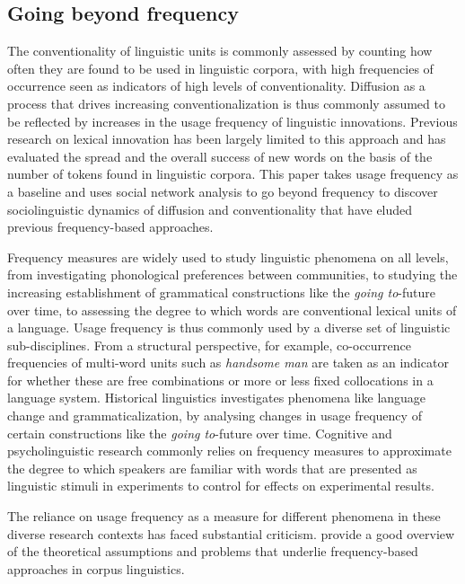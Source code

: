 \documentclass[
  a4paper,
  abstract=on,
  captions=tableabove
  ]{scrartcl}
\begin{document}
  \subsection{Going beyond frequency}
    \label{subsec:beyond-freq}

  The conventionality of linguistic units is commonly assessed by counting how often they are found to be used in linguistic corpora, with high frequencies of occurrence seen as indicators of high levels of conventionality. Diffusion as a process that drives increasing conventionalization is thus commonly assumed to be reflected by increases in the usage frequency of linguistic innovations. Previous research on lexical innovation has been largely limited to this approach and has evaluated the spread and the overall success of new words on the basis of the number of tokens found in linguistic corpora. This paper takes usage frequency as a baseline and uses social network analysis to go beyond frequency to discover sociolinguistic dynamics of diffusion and conventionality that have eluded previous frequency-based approaches.

  Frequency measures are widely used to study linguistic phenomena on all levels, from investigating phonological preferences between communities, to studying the increasing establishment of grammatical constructions like the \emph{going to}-future over time, to assessing the degree to which words are conventional lexical units of a language. Usage frequency is thus commonly used by a diverse set of linguistic sub-disciplines. From a structural perspective, for example, co-occurrence frequencies of multi-word units such as \emph{handsome man} are taken as an indicator for whether these are free combinations or more or less fixed collocations in a language system. Historical linguistics investigates phenomena like language change and grammaticalization, by analysing changes in usage frequency of certain constructions like the \emph{going to}-future over time. Cognitive and psycholinguistic research commonly relies on frequency measures to approximate the degree to which speakers are familiar with words that are presented as linguistic stimuli in experiments to control for effects on experimental results.

  The reliance on usage frequency as a measure for different phenomena in these diverse research contexts has faced substantial criticism. \cite{Stefanowitsch2017CorpusbasedPerspective} provide a good overview of the theoretical assumptions and problems that underlie frequency-based approaches in corpus linguistics.
\end{document}
